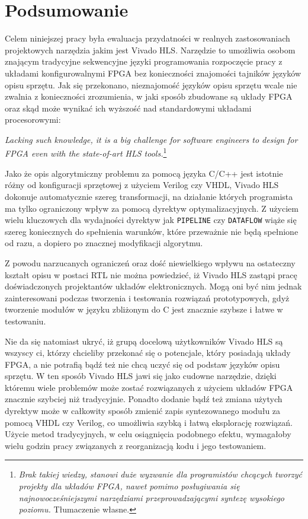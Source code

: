 \chapter*{Podsumowanie}

\pagestyle{empty}
\pagestyle{fancy}
\fancyhead{} %
\fancyhead[RO,LE]{\thepage}

Celem niniejszej pracy była ewaluacja przydatności w realnych zastosowaniach projektowych narzędzia jakim jest Vivado HLS. Narzędzie to umożliwia osobom znającym tradycyjne sekwencyjne języki programowania rozpoczęcie pracy z układami konfigurowalnymi FPGA bez konieczności znajomości tajników języków opisu sprzętu. Jak się przekonano, nieznajomość języków opisu sprzętu wcale nie zwalnia z konieczności zrozumienia, w jaki sposób zbudowane są układy FPGA oraz skąd może wynikać ich wyższość nad standardowymi układami procesorowymi:

\begin{displayquote}
\textit{Lacking such knowledge, it is a big challenge for software engineers to design for FPGA even with the state-of-art HLS tools.}\footnote{\textit{Brak takiej wiedzy, stanowi duże wyzwanie dla programistów chcących tworzyć projekty dla układów FPGA, nawet pomimo posługiwania się najnowocześniejszymi narzędziami przeprowadzającymi syntezę wysokiego poziomu.} Tłumaczenie własne.}\cite{FPGA_SD}
\end{displayquote}

Jako że opis algorytmiczny problemu za pomocą języka C/C++ jest istotnie różny od konfiguracji sprzętowej z użyciem Verilog czy VHDL, Vivado HLS dokonuje automatycznie szereg transformacji, na działanie których programista ma tylko ograniczony wpływ za pomocą dyrektyw optymalizacyjnych. Z użyciem wielu kluczowych dla wydajności dyrektyw jak \texttt{PIPELINE} czy \texttt{DATAFLOW} wiąże się szereg koniecznych do spełnienia warunków, które przeważnie nie będą spełnione od razu, a dopiero po znacznej modyfikacji algorytmu. 

Z powodu narzucanych ograniczeń oraz dość niewielkiego wpływu na ostateczny kształt opisu w postaci RTL nie można powiedzieć, iż Vivado HLS zastąpi pracę doświadczonych projektantów układów elektronicznych. Mogą oni być nim jednak zainteresowani podczas tworzenia i testowania rozwiązań prototypowych, gdyż tworzenie modułów w języku zbliżonym do C jest znacznie szybsze i łatwe w testowaniu. 

Nie da się natomiast ukryć, iż grupą docelową użytkowników Vivado HLS są wszyscy ci, którzy chcieliby przekonać się o potencjale, który posiadają układy FPGA, a nie potrafią bądź też nie chcą uczyć się od podstaw języków opisu sprzętu. W ten sposób Vivado HLS jawi się jako cudowne narzędzie, dzięki któremu wiele problemów może zostać rozwiązanych z użyciem układów FPGA znacznie szybciej niż tradycyjnie. Ponadto dodanie bądź też zmiana użytych dyrektyw może w całkowity sposób zmienić zapis syntezowanego modułu za pomocą VHDL czy Verilog, co umożliwia szybką i łatwą eksplorację rozwiązań. Użycie metod tradycyjnych, w celu osiągnięcia podobnego efektu, wymagałoby wielu godzin pracy związanych z reorganizacją kodu i jego testowaniem.

